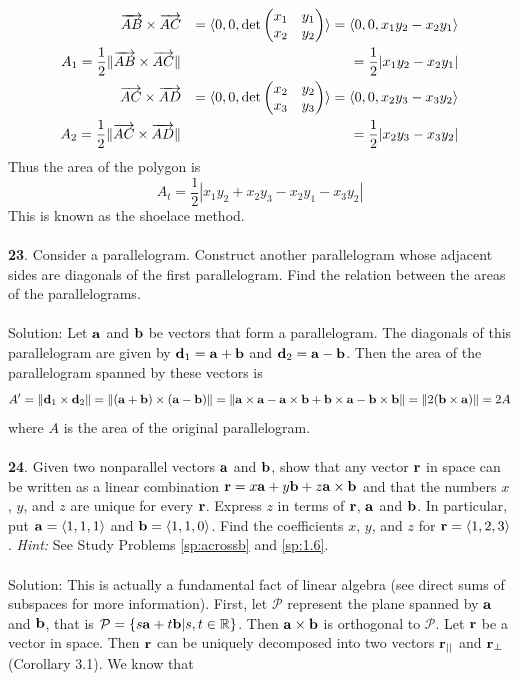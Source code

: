 \documentclass[12pt]{amsbook}
\newcommand{\la}{\langle}
\newcommand{\ra}{\rangle}
\begin{document}
\begin{eqnarray*}
\overrightarrow{AB}\times\overrightarrow{AC}&&=\la 0,0,\det\begin{pmatrix} x_1&y_1\cr x_2&y_2 \end{pmatrix} \ra = \la 0,0, x_1y_2-x_2y_1 \ra \\
A_1=\frac 12\|\overrightarrow{AB}\times\overrightarrow{AC}\| &&=\frac 12 |x_1y_2-x_2y_1|\\
\overrightarrow{AC}\times\overrightarrow{AD}&&=\la 0,0,\det\begin{pmatrix} x_2&y_2\cr x_3&y_3 \end{pmatrix} \ra = \la 0,0, x_2y_3-x_3y_2 \ra \\
A_2= \frac 12\|\overrightarrow{AC}\times\overrightarrow{AD}\| &&=\frac 12 |x_2y_3-x_3y_2|
\end{eqnarray*}
Thus the area of the polygon is 
$$A_t=\frac 12|x_1y_2+x_2y_3-x_2y_1-x_3y_2|$$
This is known as the shoelace method.
\\
\\
{\small\bf 23}. Consider a parallelogram. Construct another
parallelogram whose adjacent sides are diagonals of the first
parallelogram. Find the relation between the areas of the
parallelograms.\\
\\
{\sc Solution}: Let $\bf a$ and $\bf b$ be vectors that form a parallelogram. The diagonals of this parallelogram are given by ${\bf d}_1=\bf a+b$ and ${\bf d}_2=\bf a-b$. Then the area of the parallelogram spanned by these vectors is 
$$A'=\|{\bf d}_1\times{\bf d}_2\|=\|({\bf a}+{\bf b})\times({\bf a}-{\bf b})\|=\|{\bf a}\times{\bf a}-{\bf a}\times{\bf b}+{\bf b}\times{\bf a}-{\bf b}\times{\bf b}\|=\|2({\bf b}\times{\bf a})\|=2A$$
where $A$ is the area of the original parallelogram.
\\
\\
{\small\bf 24}. Given two nonparallel vectors ${\bf a}$ and ${\bf b}$,
show that any vector ${\bf r}$ in space can be written as a linear
combination ${\bf r}=x {\bf a}+y{\bf b} +z{\bf a}\times{\bf b}$
and that the numbers $x$, $y$, and $z$ are unique for every ${\bf
r}$. Express $z$ in terms of ${\bf r}$, ${\bf a}$ and ${\bf b}$.
In particular, put ${\bf a}=\la 1,1,1\ra$ and ${\bf b}=
\la 1,1,0\ra$. Find the coefficients $x$, $y$, and $z$
for ${\bf r}=\la 1,2,3\ra$.
{\it Hint:} See Study Problems \ref{sp:acrossb} and
\ref{sp:1.6}.\\
\\
{\sc Solution}:
This is actually a fundamental fact of linear algebra (see direct sums of subspaces for more information). First, let $\mathcal{P}$ represent the plane spanned by $\bf a$ and $\bf b$, that is $\mathcal{P}=\{s{\bf a}+t{\bf b}|s,t\in \mathbb{R}\}$. Then ${\bf a}\times{\bf b}$ is orthogonal to $\mathcal{P}$. Let $\bf r$ be a vector in space. Then $\bf r$ can be uniquely decomposed into two vectors ${\bf r}_{||}$ and ${\bf r}_\perp$ (Corollary 3.1). We know that 
\end{document}
